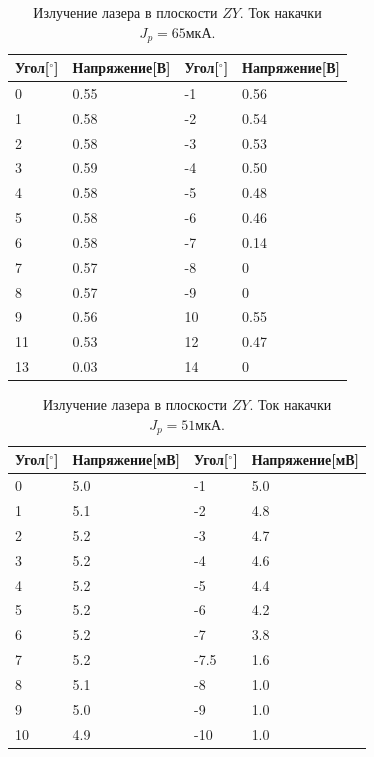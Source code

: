 \documentclass[a4paper, 12pt]{extarticle}
\begin{document}
\begin{table}[htbp]
    \begin{center}
        \begin{tabular}{|l|l|l|l|}
            \hline
            Угол[$^{\circ}$] & Напряжение[В] & Угол[$^{\circ}$] & Напряжение[В] \\
            \hline
            0  & 0.55 & -1  & 0.56 \\
            1  & 0.58 & -2  & 0.54 \\
            2  & 0.58 & -3  & 0.53 \\
            3  & 0.59 & -4  & 0.50 \\
            4  & 0.58 & -5  & 0.48 \\
            5  & 0.58 & -6  & 0.46 \\
            6  & 0.58 & -7  & 0.14 \\
            7  & 0.57 & -8  & 0    \\
            8  & 0.57 & -9  & 0    \\
            9  & 0.56 & 10  & 0.55 \\
            11 & 0.53 & 12  & 0.47 \\
            13 & 0.03 & 14  & 0    \\
            \hline
        \end{tabular}
    \end{center}
    \caption{Излучение лазера в плоскости $ZY$. Ток накачки $J_p = 65\text{мкА}$.}
    \label{tab:ZY_65}
\end{table}

\begin{table}[hbtp]
    \begin{center}
        \begin{tabular}{|l|l|l|l|}
            \hline
            Угол[$^{\circ}$] & Напряжение[мВ] & Угол[$^{\circ}$] & Напряжение[мВ] \\
            \hline
            0  & 5.0  & -1  & 5.0  \\
            1  & 5.1  & -2  & 4.8  \\
            2  & 5.2  & -3  & 4.7  \\
            3  & 5.2  & -4  & 4.6  \\
            4  & 5.2  & -5  & 4.4  \\
            5  & 5.2  & -6  & 4.2  \\
            6  & 5.2  & -7  & 3.8  \\
            7  & 5.2  & -7.5 & 1.6 \\
            8  & 5.1  & -8  & 1.0  \\
            9  & 5.0  & -9  & 1.0  \\
            10 & 4.9  & -10 & 1.0  \\
            \hline
        \end{tabular}
    \end{center}
    \caption{Излучение лазера в плоскости $ZY$. Ток накачки $J_p = 51\text{мкА}$.}
    \label{tab:ZY_51}
\end{table}
\end{document}
